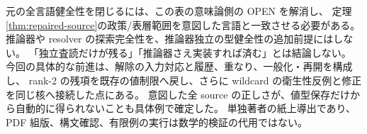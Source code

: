 \documentclass[11pt,a4paper]{article}
\begin{document}
元の全言語健全性を閉じるには、この表の意味論側の OPEN を解消し、
定理\ref{thm:repaired-source}の政策/表層範囲を意図した言語と一致させる必要がある。
推論器や resolver の探索完全性を、推論器独立の型健全性の追加前提にはしない。
「独立査読だけが残る」「推論器さえ実装すれば済む」とは結論しない。
今回の具体的な前進は、解除の入力対応と履歴、重なり、一般化・再開を構成し、
rank-2 の残項を既存の値制限へ戻し、さらに wildcard の衛生性反例と修正を同じ核へ接続した点にある。
意図した全 source の正しさが、値型保存だけから自動的に得られないことも具体例で確定した。
単独著者の紙上導出であり、PDF 組版、構文確認、有限例の実行は数学的検証の代用ではない。
\end{document}

